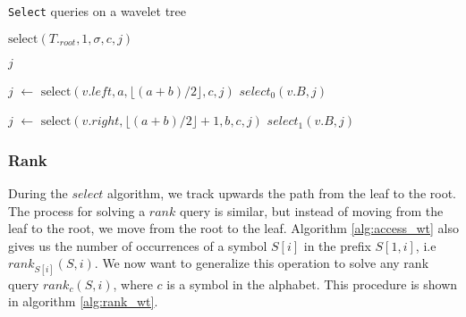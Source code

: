 \begin{algorithm}
    \caption{\texttt{Select} queries on a wavelet tree}\label{alg:select_wt}
    \begin{algorithmic}

        \State \Return $\text{select}(T._{root},1, \sigma, c, j)$
        \EndFunction



        \State \Return $j$
        \EndIf

        \State $j$ $\gets$ $\text{select}(v.left, a, \lfloor (a+b)/2 \rfloor, c, j)$
        \Return $select_0(v.B,j)$

        \Else
        \State $j$ $\gets$ $\text{select}(v.right, \lfloor (a+b)/2 \rfloor +1, b, c, j)$
        \State \Return $select_1(v.B,j)$
        \EndIf

        \EndFunction

    \end{algorithmic}
\end{algorithm}

\subsubsection{Rank}
During the $select$ algorithm, we track upwards the path from the leaf to the root. The process for solving a $rank$ query is similar, but instead of moving from the leaf to the root, we move from the root to the leaf. Algorithm \ref{alg:access_wt} also gives us the number of occurrences of a symbol $S[i]$ in the prefix $S[1,i]$, i.e $rank_{S[i]}(S,i)$. We now want to generalize this operation to solve any rank query $rank_c(S,i)$, where $c$ is a symbol in the alphabet. This procedure is shown in algorithm \ref{alg:rank_wt}.

